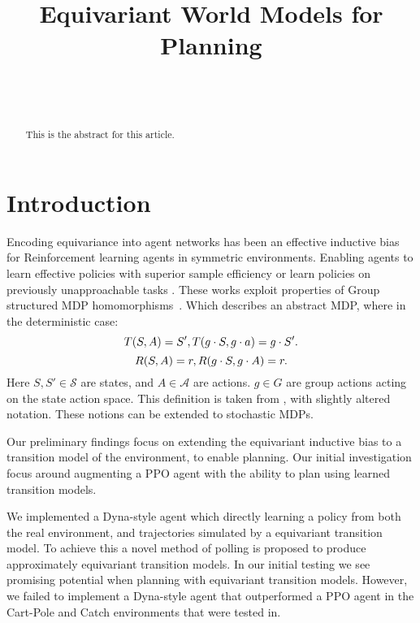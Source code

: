 \documentclass[mlabstract]{jmlr}
\title[Equivariant Planning]{Equivariant World Models for Planning}
\author{\Name{Sean Craven} \Email{sean.craven.22@ucl.ac.uk, sean.craven@advai.co.uk}\\
 \AND
\Name{Caswell Barry} \Email{}\\}
\begin{document}
\maketitle

\begin{abstract}
	This is the abstract for this article.
\end{abstract}

\section{Introduction}
Encoding equivariance into agent networks has been an effective inductive bias for Reinforcement learning agents in symmetric environments. Enabling agents to learn effective policies with superior sample efficiency \cite{van2020plannable, mondal2020group} or learn policies on previously unapproachable tasks \cite{wang2022so2}. These works exploit properties of Group structured MDP homomorphisms~\cite{ravindran2003smdp, ravindran2001symmetries}. Which describes an abstract MDP, where in the deterministic case:
\begin{equation}
  T(S, A) = S', \\
  T(g \cdot S, g \cdot a) = g \cdot S'.
  \label{eq:gs_mdp}
\end{equation}
\begin{equation}
  R(S, A) = r, \\
  R(g \cdot S, g \cdot A) = r.
  \label{eq:gs_mdp_rw}
\end{equation}
Here $S, S' \in \mathcal{S}$ are states, and $A \in \mathcal{A}$ are actions. $g \in G$ are group actions acting on the state action space. This definition is taken from \cite{van2020plannable}, with slightly altered notation. These notions can be extended to stochastic MDPs.

Our preliminary findings focus on extending the equivariant inductive bias to a transition model of the environment, to enable planning. Our initial investigation focus around augmenting a PPO agent with the ability to plan using learned transition models.

We implemented a Dyna-style agent which directly learning a policy from both the real environment, and trajectories simulated by a equivariant transition model. To achieve this a novel method of polling is proposed to produce approximately equivariant transition models. In our initial testing we see promising potential when planning with equivariant transition models. However, we failed to implement a Dyna-style agent that outperformed a PPO agent in the Cart-Pole and Catch environments that were tested in.
\end{document}

